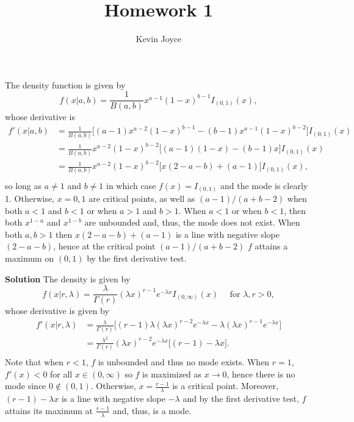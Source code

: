 \documentclass{homework}
\title{Homework 1}
\author{Kevin Joyce}
\begin{document}

  \begin{solution}
  The density function is given by 
  $$
    f(x|a,b) = \frac{1}{B(a,b)} x^{a-1}(1-x)^{b-1}I_{(0,1)}(x),
  $$
  whose derivative is 
  \begin{align*}
    f'(x|a,b) &= \frac{1}{B(a,b)} \Big[ (a-1)x^{a-2}(1-x)^{b-1} - (b-1)x^{a-1}(1-x)^{b-2}\Big]I_{(0,1)}(x) \\
	      &= \frac{1}{B(a,b)} x^{a-2}(1-x)^{b-2} \big[ (a-1)(1-x) - (b-1)x \big]I_{(0,1)}(x) \\
	      &= \frac{1}{B(a,b)} x^{a-2}(1-x)^{b-2} \big[ x(2-a-b) + (a-1)  \big]I_{(0,1)}(x), \\
  \end{align*}
  so long as $a\not=1$ and $b\not=1$ in which case $f(x) = I_{(0,1)}$ and the mode is clearly 1.  Otherwise, $x=0, 1$ are critical points, as well as $(a-1)/(a+b-2)$ when both $a<1$ and $b<1$ or when $a>1$ and $b>1$.  When $a<1$ or when $b<1$, then both $x^{1-a}$ and $x^{1-b}$ are unbounded and, thus, the mode does not exist.  When both $a,b>1$ then $x(2-a-b) + (a-1)$ is a line with negative slope $(2-a-b)$, hence at the critical point $(a-1)/(a+b-2)$ $f$ attains a maximum on $(0,1)$ by the first derivative test.
  \end{solution}

  \textbf{Solution}
  The density is given by
  $$
    f(x|r,\lambda) = \frac{\lambda}{\Gamma(r)} (\lambda x)^{r-1}e^{-\lambda x}I_{(0,\infty)}(x) \quad \text{ for } \lambda,r>0,
  $$
  whose derivative is given by
  \begin{align*}
    f'(x|r,\lambda) &= \frac{\lambda}{\Gamma(r)}\Big[ (r-1)\lambda(\lambda x)^{r-2}e^{-\lambda x} - \lambda (\lambda x)^{r-1}e^{-\lambda x} \Big] \\
      &= \frac{\lambda^2}{\Gamma(r)} (\lambda x)^{r-2} e^{-\lambda x}\Big[ (r-1) - \lambda x\Big]. \\
\end{align*}
  Note that when $r < 1$, $f$ is unbounded and thus no mode exists. When $ r = 1 $, $f'(x) < 0$ for all $x \in (0,\infty)$ so $f$ is maximized as $x\to0$, hence there is no mode since $0\notin(0,1)$.  Otherwise, $x = \frac{r-1}{\lambda}$ is a critical point. Moreover, $(r-1) - \lambda x$ is a line with negative slope $-\lambda$ and by the first derivative test, $f$ attains its maximum at $\frac{r-1}{\lambda}$ and, thus, is a mode.  
  
\end{document}
